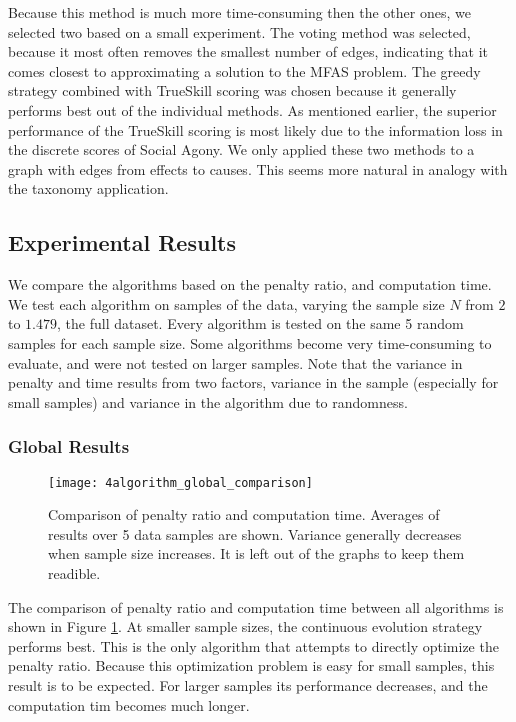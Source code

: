 Because this method is much more time-consuming then the other ones, we selected two based on a small experiment. The voting method was selected, because it most often removes the smallest number of edges, indicating that it comes closest to approximating a solution to the MFAS problem. The greedy strategy combined with TrueSkill scoring was chosen because it  generally performs best out of the individual methods. As mentioned earlier, the superior performance of the TrueSkill scoring is most likely due to the information loss in the discrete scores of Social Agony. We only applied these two methods to a graph with edges from effects to causes. This seems more natural in analogy with the taxonomy application. 


\subsection{Experimental Results}

We compare the algorithms based on the penalty ratio, and computation time. We test each algorithm on samples of the data, varying the sample size $N$ from $2$ to $1.479$, the full dataset. Every algorithm is tested on the same 5 random samples for each sample size. Some algorithms become very time-consuming to evaluate, and were not tested on larger samples. Note that the variance in penalty and time results from two factors, variance in the sample (especially for small samples) and variance in the algorithm due to randomness. 

\subsubsection{Global Results}

\begin{figure}[h]
    \centering
    \texttt{[image: 4algorithm\_global\_comparison]}
    \caption{Comparison of penalty ratio and computation time. Averages of results over 5 data samples are shown. Variance generally decreases when sample size increases. It is left out of the graphs to keep them readible.}
    \label{fig:4:general}
\end{figure}  

The comparison of penalty ratio and computation time between all algorithms is shown in Figure \ref{fig:4:general}. At smaller sample sizes, the continuous evolution strategy performs best. This is the only algorithm that attempts to directly optimize the penalty ratio. Because this optimization problem is easy for small samples, this result is to be expected. For larger samples its performance decreases, and the computation tim becomes much longer. 

